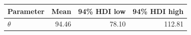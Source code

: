 \begin{tabular}{lrrr}
\toprule
Parameter & Mean & 94\% HDI low & 94\% HDI high \\
\midrule
$\theta$ & 94.46 & 78.10 & 112.81 \\
\bottomrule
\end{tabular}
